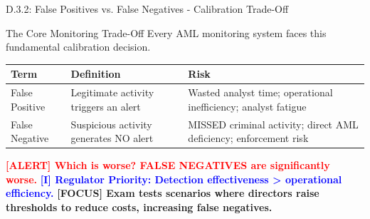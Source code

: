 \documentclass[11pt,a4paper]{beamer}
\newcommand{\redflag}[1]{\textcolor{red}{\textbf{[ALERT] #1}}}
\newcommand{\bluenote}[1]{\textcolor{blue}{\textbf{[I] #1}}}
\newcommand{\examfocus}[1]{\textcolor{orange!80!black}{\textbf{[FOCUS] #1}}}
\begin{document}
\begin{frame}{D.3.2: False Positives vs. False Negatives - Calibration Trade-Off}
	\begin{block}{The Core Monitoring Trade-Off}
		Every AML monitoring system faces this fundamental calibration decision.
	\end{block}
	\begin{tabular}{p{}|p{}|p{}}
		\hline
		\rowcolor{lightgray}
		\textbf{Term} & \textbf{Definition} & \textbf{Risk} \\
		\hline
		False Positive & Legitimate activity triggers an alert & Wasted analyst time; operational inefficiency; analyst fatigue \\
		\hline
		False Negative & Suspicious activity generates NO alert & MISSED criminal activity; direct AML deficiency; enforcement risk \\
		\hline
	\end{tabular}
	\vspace{0.2cm}
	\redflag{Which is worse? FALSE NEGATIVES are significantly worse.}
	\bluenote{Regulator Priority: Detection effectiveness > operational efficiency.}
	\examfocus{Exam tests scenarios where directors raise thresholds to reduce costs, increasing false negatives.}
\end{frame}
\end{document}
